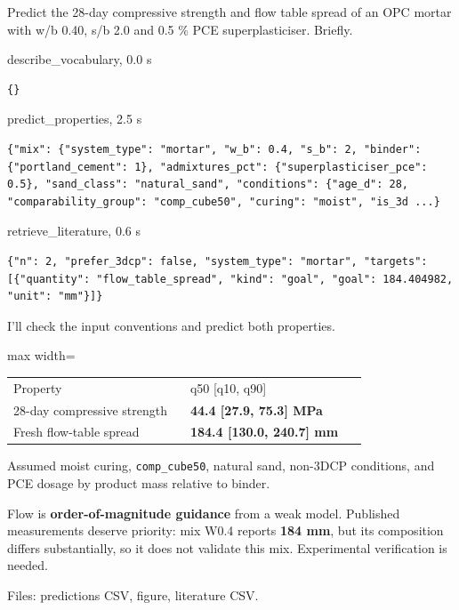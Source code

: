 \begin{userbox}
Predict the 28-day compressive strength and flow table spread of an OPC mortar with w/b 0.40, s/b 2.0 and 0.5 \% PCE superplasticiser. Briefly.
\end{userbox}
\begin{toolbox}{describe\_vocabulary, 0.0 s}
\begin{lstlisting}[style=argstyle]
{}
\end{lstlisting}
\end{toolbox}
\begin{toolbox}{predict\_properties, 2.5 s}
\begin{lstlisting}[style=argstyle]
{"mix": {"system_type": "mortar", "w_b": 0.4, "s_b": 2, "binder": {"portland_cement": 1}, "admixtures_pct": {"superplasticiser_pce": 0.5}, "sand_class": "natural_sand", "conditions": {"age_d": 28, "comparability_group": "comp_cube50", "curing": "moist", "is_3d ...}
\end{lstlisting}
\end{toolbox}
\begin{toolbox}{retrieve\_literature, 0.6 s}
\begin{lstlisting}[style=argstyle]
{"n": 2, "prefer_3dcp": false, "system_type": "mortar", "targets": [{"quantity": "flow_table_spread", "kind": "goal", "goal": 184.404982, "unit": "mm"}]}
\end{lstlisting}
\end{toolbox}
\begin{agentbox}
I'll check the input conventions and predict both properties.\par
\par\smallskip\begin{adjustbox}{max width=\linewidth}\begin{tabular}{p{0.47\linewidth}p{0.47\linewidth}}
Property & q50 [q10, q90] \\
28-day compressive strength & \textbf{44.4 [27.9, 75.3] MPa} \\
Fresh flow-table spread & \textbf{184.4 [130.0, 240.7] mm} \\
\end{tabular}\end{adjustbox}\par\smallskip
\par
Assumed moist curing, \texttt{comp\_cube50}, natural sand, non-3DCP conditions, and PCE dosage by product mass relative to binder.\par
\par
Flow is \textbf{order-of-magnitude guidance} from a weak model. Published measurements deserve priority: mix W0.4 reports \textbf{184 mm}, but its composition differs substantially, so it does not validate this mix. Experimental verification is needed.\par
\par
Files: predictions CSV, figure, literature CSV.\par
\par
\end{agentbox}
